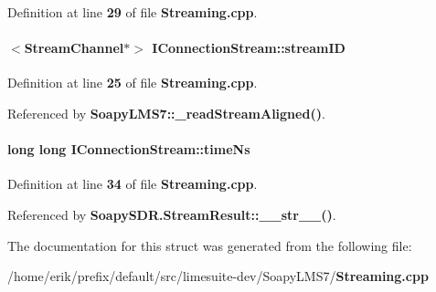 Definition at line {\bf 29} of file {\bf Streaming.\+cpp}.

\paragraph[{stream\+ID}]{$<${\bf Stream\+Channel}$\ast$$>$ I\+Connection\+Stream\+::stream\+ID}\label{structIConnectionStream_a2115942414fe45d0d71512ecf7e11605}


Definition at line {\bf 25} of file {\bf Streaming.\+cpp}.



Referenced by {\bf Soapy\+L\+M\+S7\+::\+\_\+read\+Stream\+Aligned()}.

\paragraph[{time\+Ns}]{\setlength{\rightskip}{0pt plus 5cm}long long I\+Connection\+Stream\+::time\+Ns}\label{structIConnectionStream_a70f84691fe75449f0015d9fad535fa93}


Definition at line {\bf 34} of file {\bf Streaming.\+cpp}.



Referenced by {\bf Soapy\+S\+D\+R.\+Stream\+Result\+::\+\_\+\+\_\+str\+\_\+\+\_\+()}.



The documentation for this struct was generated from the following file\+:\begin{DoxyCompactItemize}
\item 
/home/erik/prefix/default/src/limesuite-\/dev/\+Soapy\+L\+M\+S7/{\bf Streaming.\+cpp}\end{DoxyCompactItemize}
